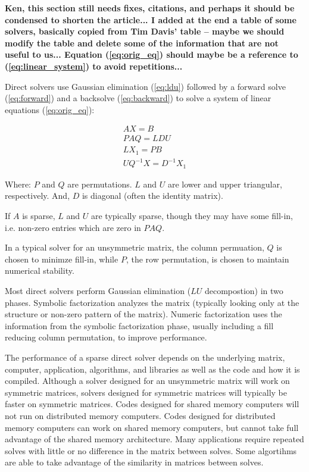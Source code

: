 \documentclass[acmtocl]{acmtrans2m}
\begin{document}
{\bf Ken, this section still needs fixes, citations, and perhaps it should
  be condensed to shorten the article... I added at the end a table of some
    solvers, basically copied from Tim Davis' table -- maybe we should modify
the table and delete some of the information that are not useful to us...
Equation (\ref{eq:orig_eq}) should maybe be a reference to
(\ref{eq:linear_system}) to avoid repetitions...}

Direct solvers use Gaussian elimination (\ref{eq:ldu}) followed by a
forward solve (\ref{eq:forward}) and a backsolve (\ref{eq:backward})
to solve a system of linear equations (\ref{eq:orig_eq}):

\begin{eqnarray}
  \label{eq:orig_eq}
  A X = B \\ 
  \label{eq:ldu}
  PAQ = LDU \\
  \label{eq:forward}
  LX_1 = PB \\
  \label{eq:backward}
  UQ^{-1}X = D^{-1}X_1  
\end{eqnarray}

Where: $P$ and $Q$ are permutations.  $L$ and $U$ are lower and upper triangular, respectively.  And, $D$ is diagonal (often the identity matrix).  

If $A$ is sparse, $L$ and $U$
are typically sparse, though they may have some fill-in, i.e. non-zero entries which are zero in
$PAQ$.  

In a typical solver for an unsymmetric matrix, the column permuation,
$Q$ is chosen to minimze fill-in, while $P$, the row permutation, is
chosen to maintain numerical stability.  

Most direct solvers perform Gaussian elimination ($LU$ decompostion) in
two phases.  Symbolic factorization analyzes the matrix (typically
looking only at the structure or non-zero pattern of the matrix).
Numeric factorization uses the information from the symbolic
factorization phase, usually including a fill reducing column permutation, 
to improve performance.  

The performance of a sparse direct solver depends on the underlying
matrix, computer, application, algorithms, and libraries as well as
the code and how it is compiled.  Although a solver designed for an
unsymmetric matrix will work on symmetric matrices, solvers designed
for symmetric matrices will typically be faster on symmetric matrices.
Codes designed for shared memory computers will not run on distributed
memory computers.  Codes designed for distributed memory computers can
work on shared memory computers, but cannot take full advantage of the
shared memory architecture.  Many applications require repeated solves
with little or no difference in the matrix between solves.  Some
algortihms are able to take advantage of the similarity in matrices
between solves.
\end{document}

